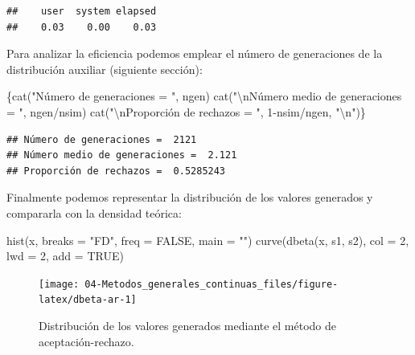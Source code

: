 \documentclass[
]{book}
\newenvironment{Shaded}{\begin{snugshade}}{\end{snugshade}}
\newcommand{\AttributeTok}[1]{\textcolor[rgb]{0.77,0.63,0.00}{#1}}
\newcommand{\ConstantTok}[1]{\textcolor[rgb]{0.00,0.00,0.00}{#1}}
\newcommand{\DecValTok}[1]{\textcolor[rgb]{0.00,0.00,0.81}{#1}}
\newcommand{\FunctionTok}[1]{\textcolor[rgb]{0.00,0.00,0.00}{#1}}
\newcommand{\NormalTok}[1]{#1}
\newcommand{\SpecialCharTok}[1]{\textcolor[rgb]{0.00,0.00,0.00}{#1}}
\newcommand{\StringTok}[1]{\textcolor[rgb]{0.31,0.60,0.02}{#1}}
\theoremstyle{break}
\theoremstyle{nonumberplain}
\begin{document}
\begin{verbatim}
##    user  system elapsed 
##    0.03    0.00    0.03
\end{verbatim}

Para analizar la eficiencia podemos emplear el número de generaciones de la distribución auxiliar (siguiente sección):

\begin{Shaded}
\begin{Highlighting}[]
\NormalTok{\{}\FunctionTok{cat}\NormalTok{(}\StringTok{"Número de generaciones = "}\NormalTok{, ngen)}
\FunctionTok{cat}\NormalTok{(}\StringTok{"}\SpecialCharTok{\textbackslash{}n}\StringTok{Número medio de generaciones = "}\NormalTok{, ngen}\SpecialCharTok{/}\NormalTok{nsim)}
\FunctionTok{cat}\NormalTok{(}\StringTok{"}\SpecialCharTok{\textbackslash{}n}\StringTok{Proporción de rechazos = "}\NormalTok{, }\DecValTok{1}\SpecialCharTok{{-}}\NormalTok{nsim}\SpecialCharTok{/}\NormalTok{ngen, }\StringTok{"}\SpecialCharTok{\textbackslash{}n}\StringTok{"}\NormalTok{)\}}
\end{Highlighting}
\end{Shaded}

\begin{verbatim}
## Número de generaciones =  2121
## Número medio de generaciones =  2.121
## Proporción de rechazos =  0.5285243
\end{verbatim}

Finalmente podemos representar la distribución de los valores generados y compararla con la densidad teórica:

\begin{Shaded}
\begin{Highlighting}[]
\FunctionTok{hist}\NormalTok{(x, }\AttributeTok{breaks =} \StringTok{"FD"}\NormalTok{, }\AttributeTok{freq =} \ConstantTok{FALSE}\NormalTok{, }\AttributeTok{main =} \StringTok{""}\NormalTok{)}
\FunctionTok{curve}\NormalTok{(}\FunctionTok{dbeta}\NormalTok{(x, s1, s2), }\AttributeTok{col =} \DecValTok{2}\NormalTok{, }\AttributeTok{lwd =} \DecValTok{2}\NormalTok{, }\AttributeTok{add =} \ConstantTok{TRUE}\NormalTok{)}
\end{Highlighting}
\end{Shaded}

\begin{figure}[!htb]

{\centering \texttt{[image: 04-Metodos\_generales\_continuas\_files/figure-latex/dbeta-ar-1]} 

}

\caption{Distribución de los valores generados mediante el método de aceptación-rechazo.}\label{fig:dbeta-ar}
\end{figure}
\end{document}
